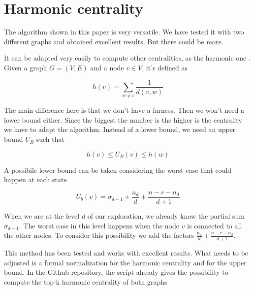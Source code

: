 \section{Harmonic centrality}

The algorithm shown in this paper is very versatile. We have tested it with two different graphs and obtained excellent results. But there could be more.

\s \nd It can be adapted very easily to compute other centralities, as the harmonic one \cite{2000}. Given a graph $G = (V,E)$ and a node $v \in V$, it's defined as

\begin{equation}
    h(v) = \sum_{w \neq v} \frac{1}{d(v,w)}
\end{equation}

\nd The main difference here is that we don't have a farness. Then we won't need a lower bound either. Since the biggest the number is the higher is the centrality we have to adapt the algorithm. Instead of a lower bound, we need an upper bound $U_B$ such that

\begin{equation}
    h(v) \leq U_B (v) \leq h(w)
\end{equation}

\nd A possibile lower bound can be taken considering the worst case that could happen at each state

\begin{equation}
    U_b (v) = \sigma_{d-1} + \frac{n_d}{d} + \frac{n - r - n_d}{d+1}
\end{equation}

\nd When we are at the level $d$ of our exploration, we already know the partial sum $\sigma_{d-1}$. The worst case in this level happens when the node $v$ is connected to all the other nodes. To consider this possibility we add the factors $\frac{n_d}{d} + \frac{n - r - n_d}{d+1}$.

\s \nd This method has been tested and works with excellent results. What needs to be adjusted is a formal normalization for the harmonic centrality and for the upper bound. In the Github repository, the script already gives the possibility to compute the top-k harmonic centrality of both graphs

